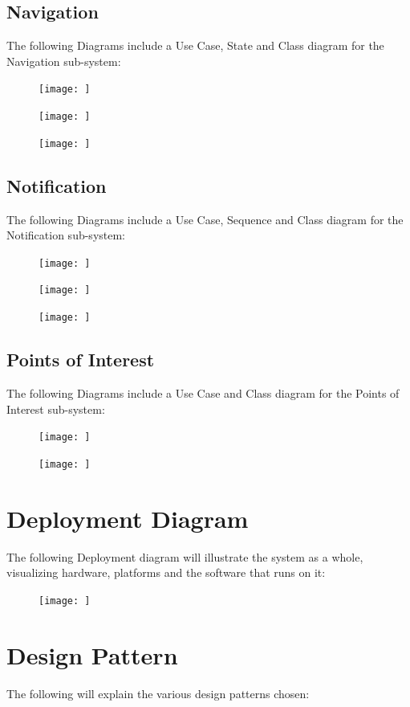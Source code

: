 \documentclass{article}
\begin{document}
	\subsection{Navigation}
	The following Diagrams include a Use Case, State and Class diagram for the Navigation sub-system:
	\begin{figure}[h]
  		\texttt{[image: ]}
	\end{figure}
	\begin{figure}[h]
  		\texttt{[image: ]}
	\end{figure}
	\begin{figure}[h]
  		\texttt{[image: ]}
	\end{figure}
	
	\subsection{Notification}
	The following Diagrams include a Use Case, Sequence and Class diagram for the Notification sub-system:
	\begin{figure}[h]
  		\texttt{[image: ]}
	\end{figure}
	\begin{figure}[h]
  		\texttt{[image: ]}
	\end{figure}
	\begin{figure}[h]
  		\texttt{[image: ]}
	\end{figure}
	
	\subsection{Points of Interest}
	The following Diagrams include a Use Case and Class diagram for the Points of Interest sub-system:
	\begin{figure}[h]
  		\texttt{[image: ]}
	\end{figure}
	\begin{figure}[h]
  		\texttt{[image: ]}
	\end{figure}
	
\section{Deployment Diagram}
The following Deployment diagram will illustrate the system as a whole, visualizing hardware, platforms and the software that runs on it:
	\begin{figure}[h]
  		\texttt{[image: ]}
	\end{figure}

\section{Design Pattern}
The following will explain the various design patterns chosen:
\end{document}
